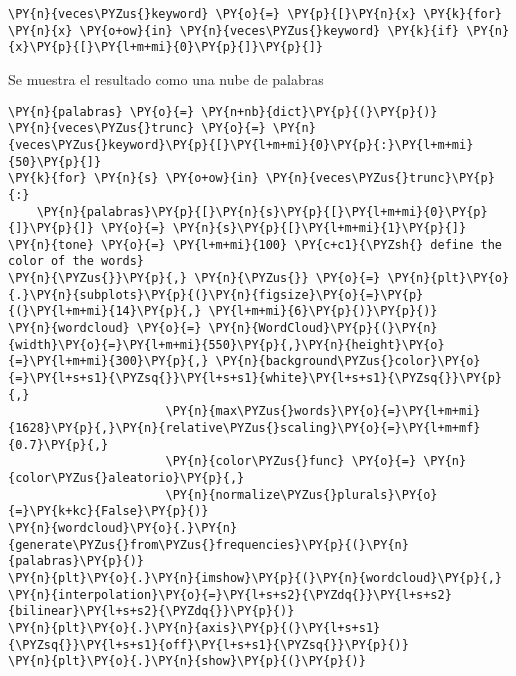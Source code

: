     \begin{tcolorbox}[breakable, size=fbox, boxrule=1pt, pad at break*=1mm,colback=cellbackground, colframe=cellborder]
\begin{Verbatim}[commandchars=\\\{\}]
\PY{n}{veces\PYZus{}keyword} \PY{o}{=} \PY{p}{[}\PY{n}{x} \PY{k}{for} \PY{n}{x} \PY{o+ow}{in} \PY{n}{veces\PYZus{}keyword} \PY{k}{if} \PY{n}{x}\PY{p}{[}\PY{l+m+mi}{0}\PY{p}{]}\PY{p}{]}
\end{Verbatim}
\end{tcolorbox}

    Se muestra el resultado como una nube de palabras

    \begin{tcolorbox}[breakable, size=fbox, boxrule=1pt, pad at break*=1mm,colback=cellbackground, colframe=cellborder]
\begin{Verbatim}[commandchars=\\\{\}]
\PY{n}{palabras} \PY{o}{=} \PY{n+nb}{dict}\PY{p}{(}\PY{p}{)}
\PY{n}{veces\PYZus{}trunc} \PY{o}{=} \PY{n}{veces\PYZus{}keyword}\PY{p}{[}\PY{l+m+mi}{0}\PY{p}{:}\PY{l+m+mi}{50}\PY{p}{]}
\PY{k}{for} \PY{n}{s} \PY{o+ow}{in} \PY{n}{veces\PYZus{}trunc}\PY{p}{:}
    \PY{n}{palabras}\PY{p}{[}\PY{n}{s}\PY{p}{[}\PY{l+m+mi}{0}\PY{p}{]}\PY{p}{]} \PY{o}{=} \PY{n}{s}\PY{p}{[}\PY{l+m+mi}{1}\PY{p}{]}
\PY{n}{tone} \PY{o}{=} \PY{l+m+mi}{100} \PY{c+c1}{\PYZsh{} define the color of the words}
\PY{n}{\PYZus{}}\PY{p}{,} \PY{n}{\PYZus{}} \PY{o}{=} \PY{n}{plt}\PY{o}{.}\PY{n}{subplots}\PY{p}{(}\PY{n}{figsize}\PY{o}{=}\PY{p}{(}\PY{l+m+mi}{14}\PY{p}{,} \PY{l+m+mi}{6}\PY{p}{)}\PY{p}{)}
\PY{n}{wordcloud} \PY{o}{=} \PY{n}{WordCloud}\PY{p}{(}\PY{n}{width}\PY{o}{=}\PY{l+m+mi}{550}\PY{p}{,}\PY{n}{height}\PY{o}{=}\PY{l+m+mi}{300}\PY{p}{,} \PY{n}{background\PYZus{}color}\PY{o}{=}\PY{l+s+s1}{\PYZsq{}}\PY{l+s+s1}{white}\PY{l+s+s1}{\PYZsq{}}\PY{p}{,} 
                      \PY{n}{max\PYZus{}words}\PY{o}{=}\PY{l+m+mi}{1628}\PY{p}{,}\PY{n}{relative\PYZus{}scaling}\PY{o}{=}\PY{l+m+mf}{0.7}\PY{p}{,}
                      \PY{n}{color\PYZus{}func} \PY{o}{=} \PY{n}{color\PYZus{}aleatorio}\PY{p}{,}
                      \PY{n}{normalize\PYZus{}plurals}\PY{o}{=}\PY{k+kc}{False}\PY{p}{)}
\PY{n}{wordcloud}\PY{o}{.}\PY{n}{generate\PYZus{}from\PYZus{}frequencies}\PY{p}{(}\PY{n}{palabras}\PY{p}{)}
\PY{n}{plt}\PY{o}{.}\PY{n}{imshow}\PY{p}{(}\PY{n}{wordcloud}\PY{p}{,} \PY{n}{interpolation}\PY{o}{=}\PY{l+s+s2}{\PYZdq{}}\PY{l+s+s2}{bilinear}\PY{l+s+s2}{\PYZdq{}}\PY{p}{)}
\PY{n}{plt}\PY{o}{.}\PY{n}{axis}\PY{p}{(}\PY{l+s+s1}{\PYZsq{}}\PY{l+s+s1}{off}\PY{l+s+s1}{\PYZsq{}}\PY{p}{)}
\PY{n}{plt}\PY{o}{.}\PY{n}{show}\PY{p}{(}\PY{p}{)}
\end{Verbatim}
\end{tcolorbox}

